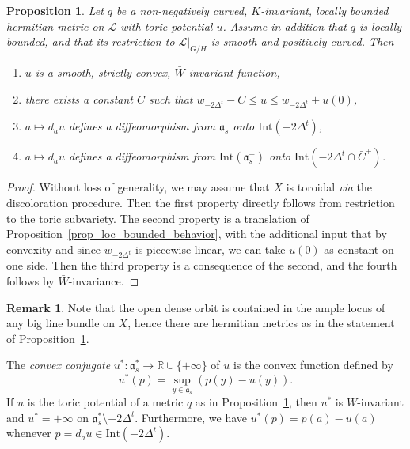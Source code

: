 \documentclass{amsart}
\newtheorem{prop}[thm]{Proposition}
\theoremstyle{definition}
\newtheorem{rem}[thm]{Remark}
\begin{document}
\begin{prop}
\label{prop_positive_metrics}
Let $q$ be a non-negatively curved, $K$-invariant, locally bounded 
hermitian metric on $\mathcal{L}$ with toric potential $u$.
Assume in addition that $q$ is locally bounded, and that its restriction to 
$\mathcal{L}|_{G/H}$ is smooth and positively curved. Then 
\begin{enumerate}
\item $u$ is a smooth, strictly convex, $\bar{W}$-invariant function,
\item there exists a constant $C$ such that 
$w_{-2\Delta^t}-C\leq u\leq w_{-2\Delta^t}+u(0)$,
\item $a\mapsto d_au$ defines a diffeomorphism from $\mathfrak{a}_s$ onto 
$\mathrm{Int}(-2\Delta^t)$,
\item $a\mapsto d_au$ defines a diffeomorphism from $\mathrm{Int}(\mathfrak{a}_s^+)$ onto 
$\mathrm{Int}(-2\Delta^t\cap \bar{C}^+)$.
\end{enumerate}
\end{prop}

\begin{proof}
Without loss of generality, we may assume that $X$ is toroidal \emph{via}
the discoloration procedure. Then the first property directly 
follows from restriction to the toric subvariety. 
The second property is a translation of Proposition~\ref{prop_loc_bounded_behavior}, 
with the additional input that by convexity and since $w_{-2\Delta^t}$ is 
piecewise linear, 
we can take $u(0)$ as constant on one side.
Then the third property is a consequence of the second, and the fourth 
follows by $\bar{W}$-invariance.
\end{proof}

\begin{rem}
Note that the open dense orbit is contained in the ample locus of 
any big line bundle on $X$, hence there are hermitian metrics as 
in the statement of Proposition~\ref{prop_positive_metrics}.
\end{rem}

The \emph{convex conjugate} $u^*:\mathfrak{a}_s^*\rightarrow \mathbb{R}\cup\{+\infty\}$ of $u$ 
is the convex function defined by 
\[
u^*(p)=\sup_{y\in\mathfrak{a}_s}(p(y)-u(y)).
\]
If $u$ is the toric potential of a metric $q$ as in Proposition~\ref{prop_positive_metrics}, 
then $u^*$ is $W$-invariant and $u^*=+\infty$ on $\mathfrak{a}_s^*\setminus -2\Delta^t$. 
Furthermore, we have 
$u^*(p)=p(a)-u(a)$ whenever $p=d_au\in \mathrm{Int}(-2\Delta^t)$. 
\end{document}
